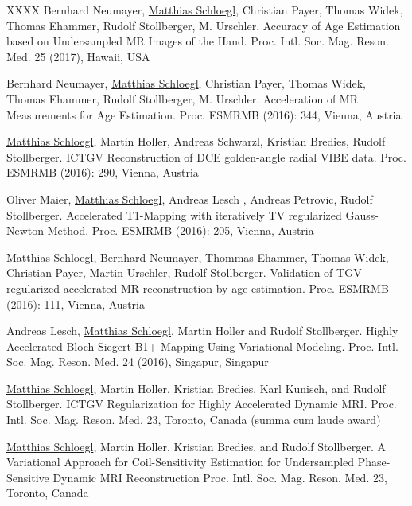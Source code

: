 \begin{thebibliography}{XXXX}
    \newblock Bernhard Neumayer, \underline{Matthias Schloegl}, Christian Payer, Thomas Widek, Thomas Ehammer, Rudolf Stollberger, M. Urschler.
    \newblock Accuracy of Age Estimation based on Undersampled MR Images of the Hand.
    \newblock Proc. Intl. Soc. Mag. Reson. Med. 25 (2017), Hawaii, USA
     
    \newblock Bernhard Neumayer, \underline{Matthias Schloegl}, Christian Payer, Thomas Widek, Thomas Ehammer, Rudolf Stollberger, M. Urschler.
    \newblock Acceleration of MR Measurements for Age Estimation.
    \newblock Proc. ESMRMB (2016): 344, Vienna, Austria
     
    \newblock \underline{Matthias Schloegl}, Martin Holler, Andreas Schwarzl, Kristian Bredies, Rudolf Stollberger.
    \newblock ICTGV Reconstruction of DCE golden-angle radial VIBE data. 
    \newblock Proc. ESMRMB (2016): 290, Vienna, Austria 
     
    \newblock Oliver Maier, \underline{Matthias Schloegl}, Andreas Lesch , Andreas Petrovic, Rudolf Stollberger.
    \newblock Accelerated T1-Mapping with iteratively TV regularized Gauss-Newton Method. 
    \newblock Proc. ESMRMB (2016): 205, Vienna, Austria 
     
    \newblock \underline{Matthias Schloegl}, Bernhard Neumayer, Thommas Ehammer, Thomas Widek, Christian Payer, Martin Urschler, Rudolf Stollberger. 
    \newblock Validation of TGV regularized accelerated MR reconstruction by age estimation. 
    \newblock Proc. ESMRMB (2016): 111, Vienna, Austria 
     
    \newblock Andreas Lesch, \underline{Matthias Schloegl}, Martin Holler and Rudolf Stollberger. 
    \newblock Highly Accelerated Bloch-Siegert B1+ Mapping Using Variational Modeling. 
    \newblock Proc. Intl. Soc. Mag. Reson. Med. 24 (2016), Singapur, Singapur
         
	\newblock \underline{Matthias Schloegl}, Martin Holler, Kristian Bredies, Karl Kunisch, and Rudolf Stollberger.
	\newblock ICTGV Regularization for Highly Accelerated Dynamic MRI.
	\newblock Proc. Intl. Soc. Mag. Reson. Med. 23, Toronto, Canada (summa cum laude award)

	\newblock \underline{Matthias Schloegl}, Martin Holler, Kristian Bredies, and Rudolf Stollberger. 
	\newblock A Variational Approach for Coil-Sensitivity Estimation for Undersampled Phase-Sensitive Dynamic MRI Reconstruction
	\newblock Proc. Intl. Soc. Mag. Reson. Med. 23, Toronto, Canada


\end{thebibliography}
